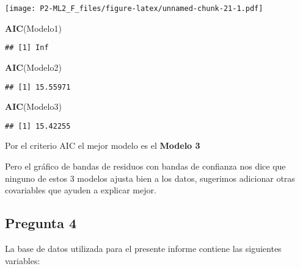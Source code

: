 \documentclass[]{article}
\newenvironment{Shaded}{\begin{snugshade}}{\end{snugshade}}
\newcommand{\KeywordTok}[1]{\textcolor[rgb]{0.13,0.29,0.53}{\textbf{#1}}}
\newcommand{\NormalTok}[1]{#1}
\begin{document}
\texttt{[image: P2-ML2\_F\_files/figure-latex/unnamed-chunk-21-1.pdf]}

\begin{Shaded}
\begin{Highlighting}[]
\KeywordTok{AIC}\NormalTok{(Modelo1)}
\end{Highlighting}
\end{Shaded}

\begin{verbatim}
## [1] Inf
\end{verbatim}

\begin{Shaded}
\begin{Highlighting}[]
\KeywordTok{AIC}\NormalTok{(Modelo2)}
\end{Highlighting}
\end{Shaded}

\begin{verbatim}
## [1] 15.55971
\end{verbatim}

\begin{Shaded}
\begin{Highlighting}[]
\KeywordTok{AIC}\NormalTok{(Modelo3)}
\end{Highlighting}
\end{Shaded}

\begin{verbatim}
## [1] 15.42255
\end{verbatim}

Por el criterio AIC el mejor modelo es el \textbf{Modelo 3}

Pero el gráfico de bandas de residuos con bandas de confianza nos dice
que ninguno de estos 3 modelos ajusta bien a los datos, sugerimos
adicionar otras covariables que ayuden a explicar mejor.

\hypertarget{pregunta-4}{%
\subsection{Pregunta 4}\label{pregunta-4}}

La base de datos utilizada para el presente informe contiene las
siguientes variables:
\end{document}
